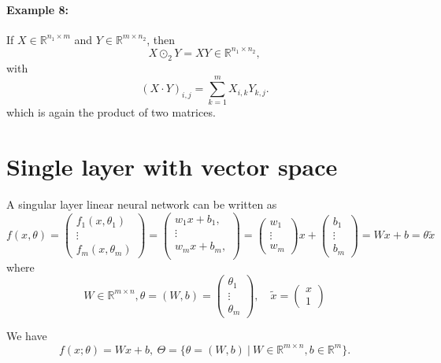 \paragraph{Example 8: } If $X \in \mathbb{R}^{n_1 \times m}$ and $Y \in \mathbb{R}^{m \times n_2}$, then
\begin{equation}\label{3DColorImage}
X \odot_2 Y =XY\in \mathbb{R}^{n_1 \times n_2},
\end{equation}
with 
\begin{equation}
(X \cdot Y)_{i,j} = \sum_{k=1}^m X_{i,k} Y_{k,j}.
\end{equation}
which is again the product of two matrices. 

\section{Single layer with vector space}
A singular layer linear neural network can be written as
$$
f(x, \theta)
=
\begin{pmatrix}
  f_1(x,\theta_1)\\
\vdots
\\
  f_m(x,\theta_m)
\end{pmatrix}
=
\begin{pmatrix}
 w_1 x+b_1, \\
\vdots
\\
 w_m x+b_m, \\
\end{pmatrix}
=
\begin{pmatrix}
 w_1\\
\vdots
\\
 w_m
\end{pmatrix}x
+
\begin{pmatrix}
b_1\\
\vdots
\\
b_m
\end{pmatrix}
=Wx+b=\theta \tilde x
$$
where
\begin{equation}
W\in \mathbb R^{m\times n}, 
\theta=(W,b)=
\begin{pmatrix}
  \theta_1\\
\vdots\\
\theta_m
\end{pmatrix}, \quad
\tilde x=
\begin{pmatrix}
  x\\
1
\end{pmatrix}
\end{equation}


We have
\begin{equation}
f(x; \theta )= W x+b, ~ \Theta = \{ \theta = (W,b) ~|~ W \in \mathbb{R}^{m \times n}, b \in \mathbb{R}^m \}.
\end{equation}

